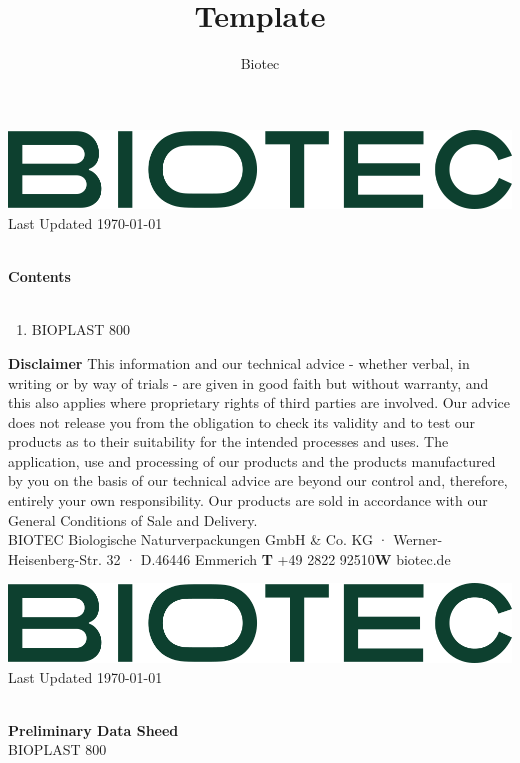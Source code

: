 \documentclass{article}
\title{Template}
\author{Biotec}
\newcommand\setItemnumber[1]{\setcounter{enumi}{\numexpr#1-1\relax}}
\begin{document}
\begin{flushleft}
\includegraphics[scale=0.20]{biotec}
\hfill\tiny Last Updated \today
\end{flushleft}
\begin{flushleft}
\hspace{1cm}\\
\textbf{Contents}\\
\hspace{5in}\\
\begin{enumerate}
\setItemnumber{2}
\item BIOPLAST 800\\

\end{enumerate}
\end{flushleft}
\vspace*{\fill}
{\scriptsize
        \textbf{Disclaimer} This information and our technical advice - whether verbal, in writing or by way of trials - are given in good faith but without warranty, and this also applies where proprietary rights of third parties are involved. Our advice does not release you from the obligation to check its validity and to test our products as to their suitability for the intended processes and uses. The application, use and processing of our products and the products manufactured by you on the basis of our technical advice are beyond our control and, therefore, entirely your own responsibility. Our products are sold in accordance with our General Conditions of Sale and Delivery.\\ 
 BIOTEC Biologische Naturverpackungen GmbH \& Co. KG · Werner-Heisenberg-Str. 32 · D.46446 Emmerich \hfill \textbf{T} +49 2822 92510\qquad \textbf{W} biotec.de}
\clearpage
\begin{flushleft}
\includegraphics[scale=0.20]{biotec}
\hfill\tiny Last Updated \today
\end{flushleft}
\begin{flushleft}
\hspace{1cm}\\
\textbf{Preliminary Data Sheed}\\
BIOPLAST 800\\
\hspace{1cm}\\
\end{flushleft}
\end{document}
